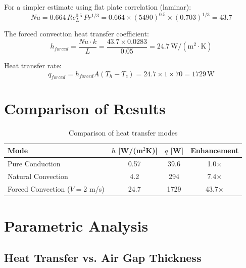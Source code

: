 \documentclass[11pt]{article}
\newcommand{\unit}[1]{\,\mathrm{#1}}
\begin{document}
For a simpler estimate using flat plate correlation (laminar):
\begin{equation}
    Nu = 0.664 \, Re_L^{0.5} \, Pr^{1/3} = 0.664 \times (5490)^{0.5} \times (0.703)^{1/3} = \boxed{43.7}
\end{equation}

The forced convection heat transfer coefficient:
\begin{equation}
    h_{forced} = \frac{Nu \cdot k}{L} = \frac{43.7 \times 0.0283}{0.05} = \boxed{24.7\unit{W/(m^2 \cdot K)}}
\end{equation}

Heat transfer rate:
\begin{equation}
    q_{forced} = h_{forced} A (T_h - T_c) = 24.7 \times 1 \times 70 = \boxed{1729\unit{W}}
\end{equation}

\section{Comparison of Results}

\begin{table}[h]
\centering
\caption{Comparison of heat transfer modes}
\begin{tabular}{lccc}
\toprule
\textbf{Mode} & \textbf{$h$ [W/(m$^2$K)]} & \textbf{$q$ [W]} & \textbf{Enhancement} \\
\midrule
Pure Conduction & 0.57 & 39.6 & 1.0$\times$ \\
Natural Convection & 4.2 & 294 & 7.4$\times$ \\
Forced Convection ($V=2$ m/s) & 24.7 & 1729 & 43.7$\times$ \\
\bottomrule
\end{tabular}
\label{tab:comparison}
\end{table}

\section{Parametric Analysis}

\subsection{Heat Transfer vs. Air Gap Thickness}
\end{document}
